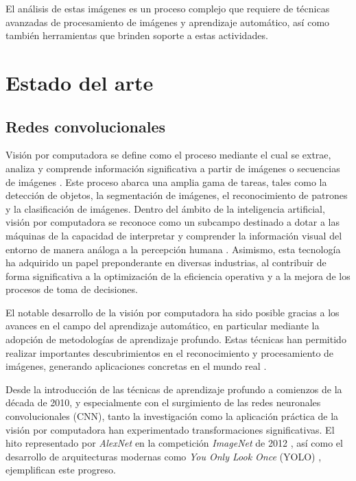 
El análisis de estas imágenes es un proceso complejo que requiere de técnicas avanzadas de procesamiento de imágenes y aprendizaje automático, así como también herramientas que brinden soporte a estas actividades.

\section{Estado del arte}
\label{sec:estadoArte}

\subsection{Redes convolucionales}
\label{sec:redesConvolucionales}

Visión por computadora se define como el proceso mediante el cual se extrae, analiza y comprende información significativa a partir de imágenes o secuencias de imágenes \citep{bmva_what_2017}. Este proceso abarca una amplia gama de tareas, tales como la detección de objetos, la segmentación de imágenes, el reconocimiento de patrones y la clasificación de imágenes. Dentro del ámbito de la inteligencia artificial, visión por computadora se reconoce como un subcampo destinado a dotar a las máquinas de la capacidad de interpretar y comprender la información visual del entorno de manera análoga a la percepción humana \citep{torralba_foundations_2024}. Asimismo, esta tecnología ha adquirido un papel preponderante en diversas industrias, al contribuir de forma significativa a la optimización de la eficiencia operativa y a la mejora de los procesos de toma de decisiones.

El notable desarrollo de la visión por computadora ha sido posible gracias a los avances en el campo del aprendizaje automático, en particular mediante la adopción de metodologías de aprendizaje profundo. Estas técnicas han permitido realizar importantes descubrimientos en el reconocimiento y procesamiento de imágenes, generando aplicaciones concretas en el mundo real \citep{dong_applications_2024}.

Desde la introducción de las técnicas de aprendizaje profundo a comienzos de la década de 2010, y especialmente con el surgimiento de las redes neuronales convolucionales (CNN), tanto la investigación como la aplicación práctica de la visión por computadora han experimentado transformaciones significativas. El hito representado por \textit{AlexNet} en la competición \textit{ImageNet} de 2012 \citep{krizhevsky_imagenet_2017}, así como el desarrollo de arquitecturas modernas como \textit{You Only Look Once} (YOLO) \cite{redmon_you_2016}, ejemplifican este progreso.


